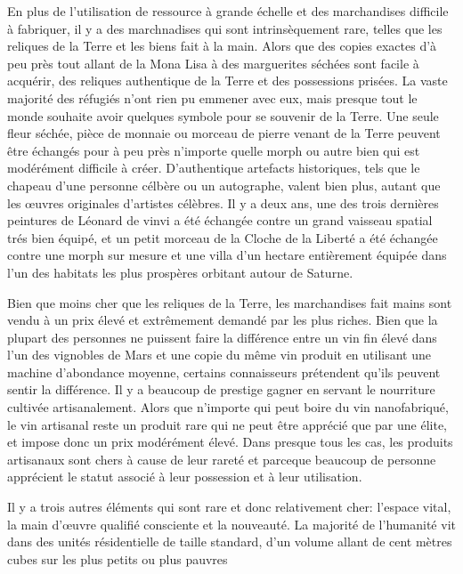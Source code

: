                En plus de l'utilisation de ressource à grande échelle et des marchandises difficile à fabriquer, il y a des marchnadises qui sont intrinsèquement rare, telles que les reliques de la Terre et les biens fait à la main. Alors que des copies exactes d'à peu près tout allant de la Mona Lisa à des marguerites séchées sont facile à acquérir, des reliques authentique de la Terre et des possessions prisées. La vaste majorité des réfugiés n'ont rien pu emmener avec eux, mais presque tout le monde souhaite avoir quelques symbole pour se souvenir de la Terre. Une seule fleur séchée, pièce de monnaie ou morceau de pierre venant de la Terre peuvent être échangés pour à peu près n'importe quelle morph ou autre bien qui est modérément difficile à créer. D'authentique artefacts historiques, tels que le chapeau d'une personne célbère ou un autographe, valent bien plus, autant que les œuvres originales d'artistes célèbres. Il y a deux ans, une des trois dernières peintures de Léonard de vinvi a été échangée contre un grand vaisseau spatial trés bien équipé, et un petit morceau de la Cloche de la Liberté a été échangée contre une morph sur mesure et une villa d'un hectare entièrement équipée dans l'un des habitats les plus prospères orbitant autour de Saturne. 

               Bien que moins cher que les reliques de la Terre, les marchandises fait mains sont vendu à un prix élevé et extrêmement demandé par les plus riches. Bien que la plupart des personnes ne puissent faire la différence entre un vin fin élevé dans l'un des vignobles de Mars et une copie du même vin produit en utilisant une machine d'abondance moyenne, certains connaisseurs prétendent qu'ils peuvent sentir la différence. Il y a beaucoup de prestige  gagner en servant le nourriture cultivée artisanalement. Alors que n'importe qui peut boire du vin nanofabriqué, le vin artisanal reste un produit rare qui ne peut être apprécié que par une élite, et impose donc un prix modérément élevé. Dans presque tous les cas, les produits artisanaux sont chers à cause de leur rareté et parceque beaucoup de personne apprécient le statut associé à leur possession et à leur utilisation. 

               Il y a trois autres éléments qui sont rare et donc relativement cher: l'espace vital, la main d'œuvre qualifié consciente et la nouveauté. La majorité de l'humanité vit dans des unités résidentielle de taille standard, d'un volume allant de cent mètres cubes sur les plus petits ou plus pauvres 

